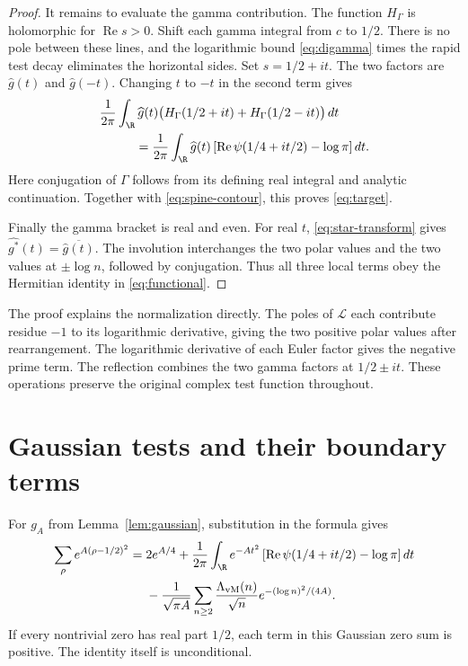 \begin{proof}
It remains to evaluate the gamma contribution.
The function $H_\Gamma$ is holomorphic for $\operatorname{Re}s>0$.
Shift each gamma integral from $c$ to $1/2$.
There is no pole between these lines, and the logarithmic bound
\eqref{eq:digamma} times the rapid test decay eliminates the horizontal sides.
Set $s=1/2+it$.  The two factors are $\widehat g(t)$ and $\widehat g(-t)$.
Changing $t$ to $-t$ in the second term gives
\begin{align*}
 &\frac1{2\pi}\int_{\R}\widehat g(t)
         \bigl(H_\Gamma(1/2+it)+H_\Gamma(1/2-it)\bigr)\,dt\\
 &\hspace{1cm}=\frac1{2\pi}\int_{\R}\widehat g(t)
     \left[\operatorname{Re}\psi(1/4+it/2)-\log\pi\right]dt.
\end{align*}
Here conjugation of $\Gamma$ follows from its defining real integral and
analytic continuation.  Together with \eqref{eq:spine-contour}, this proves
\eqref{eq:target}.

Finally the gamma bracket is real and even.
For real $t$, \eqref{eq:star-transform} gives
$\widehat{g^*}(t)=\overline{\widehat g(t)}$.
The involution interchanges the two polar values and the two values at
$\pm\log n$, followed by conjugation.
Thus all three local terms obey the Hermitian identity in
\eqref{eq:functional}.
\end{proof}

The proof explains the normalization directly.
The poles of $\mathcal L$ each contribute residue $-1$ to its logarithmic
derivative, giving the two positive polar values after rearrangement.
The logarithmic derivative of each Euler factor gives the negative prime
term.  The reflection combines the two gamma factors at $1/2\pm it$.
These operations preserve the original complex test function throughout.

\section{Gaussian tests and their boundary terms}
\label{sec:polynomial-gaussians}

For $g_A$ from Lemma~\ref{lem:gaussian}, substitution in the formula gives
\begin{equation}
\begin{split}
 \sum_\rho e^{A(\rho-1/2)^2}
 ={}&2e^{A/4}
   +\frac1{2\pi}\int_{\R}e^{-At^2}
      \left[\operatorname{Re}\psi(1/4+it/2)-\log\pi\right]dt\\
 &-\frac1{\sqrt{\pi A}}\sum_{n\geq2}
       \frac{\Lambda_{\mathrm{vM}}(n)}{\sqrt n}
                       e^{-(\log n)^2/(4A)}.
\end{split}
\label{eq:gaussian-explicit}
\end{equation}
If every nontrivial zero has real part $1/2$, each term in this Gaussian
zero sum is positive.  The identity itself is unconditional.

